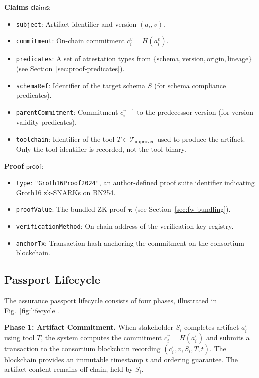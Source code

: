 \textbf{Claims} $\mathsf{claims}$:
\begin{itemize}
    \item \texttt{subject}: Artifact identifier and version $(a_i, v)$.
    \item \texttt{commitment}: On-chain commitment $c_i^{v} = H(a_i^{v})$.
    \item \texttt{predicates}: A set of attestation types from $\{\text{schema}, \text{version}, \text{origin}, \text{lineage}\}$ (see Section~\ref{sec:proof-predicates}).
    \item \texttt{schemaRef}: Identifier of the target schema $S$ (for schema compliance predicates).
    \item \texttt{parentCommitment}: Commitment $c_i^{v-1}$ to the predecessor version (for version validity predicates).
    \item \texttt{toolchain}: Identifier of the tool $T \in \mathcal{T}_{\text{approved}}$ used to produce the artifact. Only the tool identifier is recorded, not the tool binary.
\end{itemize}

\textbf{Proof} $\mathsf{proof}$:
\begin{itemize}
    \item \texttt{type}: \texttt{"Groth16Proof2024"}, an author-defined proof suite identifier indicating Groth16 zk-SNARKs on BN254.
    \item \texttt{proofValue}: The bundled ZK proof $\boldsymbol{\pi}$ (see Section~\ref{sec:fw-bundling}).
    \item \texttt{verificationMethod}: On-chain address of the verification key registry.
    \item \texttt{anchorTx}: Transaction hash anchoring the commitment on the consortium blockchain.
\end{itemize}

\subsection{Passport Lifecycle}
\label{sec:fw-lifecycle}

The assurance passport lifecycle consists of four phases, illustrated in Fig.~\ref{fig:lifecycle}.

\textbf{Phase 1: Artifact Commitment.}
When stakeholder $S_i$ completes artifact $a_i^{v}$ using tool $T$, the system computes the commitment $c_i^{v} = H(a_i^{v})$ and submits a transaction to the consortium blockchain recording $(c_i^{v}, v, S_i, T, t)$.
The blockchain provides an immutable timestamp $t$ and ordering guarantee.
The artifact content remains off-chain, held by $S_i$.

